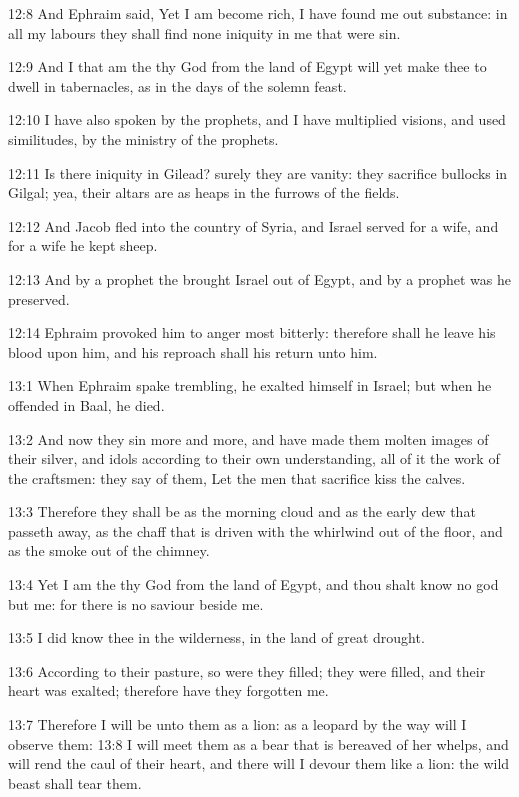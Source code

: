 12:8 And Ephraim said, Yet I am become rich, I have found me out substance: in all my labours they shall find none iniquity in me that were sin.

12:9 And I that am the \LORD thy God from the land of Egypt will yet make thee to dwell in tabernacles, as in the days of the solemn feast.

12:10 I have also spoken by the prophets, and I have multiplied visions, and used similitudes, by the ministry of the prophets.

12:11 Is there iniquity in Gilead? surely they are vanity: they sacrifice bullocks in Gilgal; yea, their altars are as heaps in the furrows of the fields.

12:12 And Jacob fled into the country of Syria, and Israel served for a wife, and for a wife he kept sheep.

12:13 And by a prophet the \LORD brought Israel out of Egypt, and by a prophet was he preserved.

12:14 Ephraim provoked him to anger most bitterly: therefore shall he leave his blood upon him, and his reproach shall his \LORD return unto him.

13:1 When Ephraim spake trembling, he exalted himself in Israel; but when he offended in Baal, he died.

13:2 And now they sin more and more, and have made them molten images of their silver, and idols according to their own understanding, all of it the work of the craftsmen: they say of them, Let the men that sacrifice kiss the calves.

13:3 Therefore they shall be as the morning cloud and as the early dew that passeth away, as the chaff that is driven with the whirlwind out of the floor, and as the smoke out of the chimney.

13:4 Yet I am the \LORD thy God from the land of Egypt, and thou shalt know no god but me: for there is no saviour beside me.

13:5 I did know thee in the wilderness, in the land of great drought.

13:6 According to their pasture, so were they filled; they were filled, and their heart was exalted; therefore have they forgotten me.

13:7 Therefore I will be unto them as a lion: as a leopard by the way will I observe them: 13:8 I will meet them as a bear that is bereaved of her whelps, and will rend the caul of their heart, and there will I devour them like a lion: the wild beast shall tear them.

